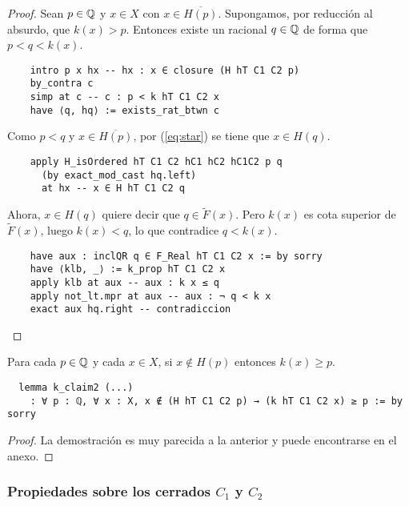 \begin{proof}
  Sean $p \in \mathbb{Q}$ y $x \in X$ con $x \in \overline{H(p)}$. Supongamos, por reducción al absurdo, que $k(x) > p$. Entonces existe un racional $q \in \mathbb{Q}$ de forma que $p < q < k(x)$.

  \begin{lstlisting}
    intro p x hx -- hx : x ∈ closure (H hT C1 C2 p)
    by_contra c
    simp at c -- c : p < k hT C1 C2 x
    have ⟨q, hq⟩ := exists_rat_btwn c \end{lstlisting}

  Como $p < q$ y $x \in \overline{H(p)}$, por (\ref{eq:star}) se tiene que $x \in H(q)$. 

  \begin{lstlisting}
    apply H_isOrdered hT C1 C2 hC1 hC2 hC1C2 p q
      (by exact_mod_cast hq.left)
      at hx -- x ∈ H hT C1 C2 q \end{lstlisting}

  Ahora, $x \in H(q)$ quiere decir que $q \in \tilde{F}(x)$. Pero $k(x)$ es cota superior de $\tilde{F}(x)$, luego $k(x) < q$, lo que contradice $q < k(x)$.

  \begin{lstlisting}
    have aux : inclQR q ∈ F_Real hT C1 C2 x := by sorry
    have ⟨klb, _⟩ := k_prop hT C1 C2 x
    apply klb at aux -- aux : k x ≤ q
    apply not_lt.mpr at aux -- aux : ¬ q < k x
    exact aux hq.right -- contradiccion\end{lstlisting}
\end{proof}

\begin{lemma}\label{claim2}
  Para cada $p \in \mathbb{Q}$ y cada $x \in X$, si $x \notin H(p)$ entonces $k(x) \geq p$.
\end{lemma}

\begin{lstlisting}
  lemma k_claim2 (...)
    : ∀ p : ℚ, ∀ x : X, x ∉ (H hT C1 C2 p) → (k hT C1 C2 x) ≥ p := by sorry
\end{lstlisting}

\begin{proof}
  La demostración es muy parecida a la anterior y puede encontrarse en el anexo.
\end{proof}

\subsubsection{Propiedades sobre los cerrados $C_1$ y $C_2$}

